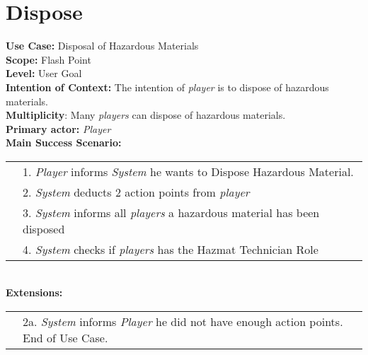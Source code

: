\documentclass{article}
\begin{document}
	\section*{Dispose}
	\textbf{Use Case:} Disposal of Hazardous Materials\\
	\textbf{Scope:} Flash Point\\
	\textbf{Level:} User Goal\\
	\textbf{Intention of Context:} The intention of \textit{player} is to dispose of hazardous materials.\\
	\textbf{Multiplicity}: Many \textit{players} can dispose of hazardous materials.\\
	\textbf{Primary actor:} \textit{Player}\\
	\textbf{Main Success Scenario:}\\
	\begin{tabular}{l l}
		&1. \textit{Player} informs \textit{System} he wants to Dispose Hazardous Material.\\
		&2. \textit{System} deducts 2 action points from \textit{player}\\
		&3. \textit{System} informs all \textit{players} a hazardous material has been disposed\\
		&4. \textit{System} checks if \textit{players} has the Hazmat Technician Role\\
	\end{tabular}\\
	\textbf{Extensions:}\\
	\begin{tabular}{l l}
		&2a. \textit{System} informs \textit{Player} he did not have enough action points. End of Use Case.
	\end{tabular}
\end{document}
